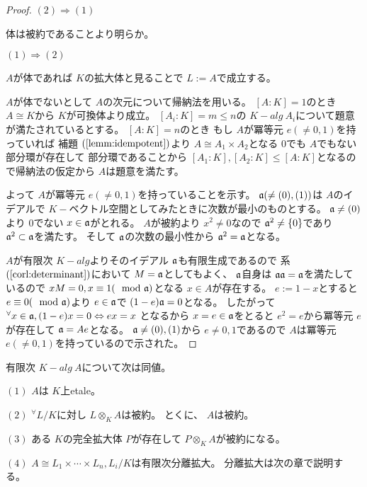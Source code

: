 \documentclass[../master_galois_theory]{subfiles}
\begin{document}
\begin{proof}
  $(2) \Rightarrow (1)$

  体は被約であることより明らか。

  $(1) \Rightarrow (2)$

  $A$が体であれば $K$の拡大体と見ることで $L := A$で成立する。

  $A$が体でないとして $A$の次元について帰納法を用いる。
  $[A:K] = 1$のとき $A \cong K$から $K$が可換体より成立。
  $[A_i:K] = m \leq n$の $K-alg \  A_i$について題意が満たされているとする。
  $[A:K] = n$のとき
  もし $A$が冪等元 $e (\neq 0 , 1)$を持っていれば
  補題 $(\mathrm{\ref{lemm:idempotent}})$より
  $A \cong A_1 \times A_2$となる $0$でも $A$でもない部分環が存在して
  部分環であることから $[A_1:K] , [A_2:K] \leq [A:K]$となるので帰納法の仮定から
  $A$は題意を満たす。

  よって $A$が冪等元 $e (\neq 0 , 1)$を持っていることを示す。
  $\mathfrak{a} (\neq (0) , (1))$は $A$のイデアルで
  $K-$ベクトル空間としてみたときに次数が最小のものとする。
  $\mathfrak{a} \neq (0)$より $0$でない $x \in \mathfrak{a}$がとれる。
  $A$が被約より $x^2 \neq 0$なので $\mathfrak{a}^2 \neq \{ 0 \}$であり
  $\mathfrak{a}^2 \subset \mathfrak{a}$を満たす。
  そして $\mathfrak{a}$の次数の最小性から $\mathfrak{a}^2 = \mathfrak{a}$となる。

  $A$が有限次 $K-alg$よりそのイデアル $\mathfrak{a}$も有限生成であるので
  系 $(\mathrm{\ref{corl:determinant}})$において $M = \mathfrak{a}$としてもよく、
  $\mathfrak{a}$自身は $\mathfrak{a} \mathfrak{a} = \mathfrak{a}$を満たしているので
  $x M = 0 , x \equiv 1 (\mod {\mathfrak{a}})$となる $x \in A$が存在する。
  $e := 1 - x$とすると $e \equiv 0 (\mod {\mathfrak{a}})$より $e \in \mathfrak{a}$で
  $(1 - e) \mathfrak{a} = 0$となる。
  したがって ${}^\forall x \in \mathfrak{a} , (1 - e)x = 0 \Leftrightarrow ex = x$
  となるから $x = e \in \mathfrak{a}$をとると $e^2 = e$から冪等元 $e$が存在して
  $\mathfrak{a} = Ae$となる。
  $\mathfrak{a} \neq (0) , (1)$から $e \neq 0 , 1$であるので
  $A$は冪等元 $e (\neq 0 , 1)$を持っているので示された。
\end{proof}

\begin{theo}
  有限次 $K-alg \  A$について次は同値。

  $(1)$
  $A$は $K$上\rm{etale}。

  $(2)$
  ${}^\forall L/K$に対し $L \otimes_K A$は被約。
  とくに、 $A$は被約。

  $(3)$
  ある $K$の完全拡大体 $P$が存在して
  $P \otimes_K A$が被約になる。

  $(4)$
  $A \cong L_1 \times \cdots \times L_n , L_i/K$は有限次分離拡大。
  分離拡大は次の章で説明する。
\end{theo}
\end{document}
